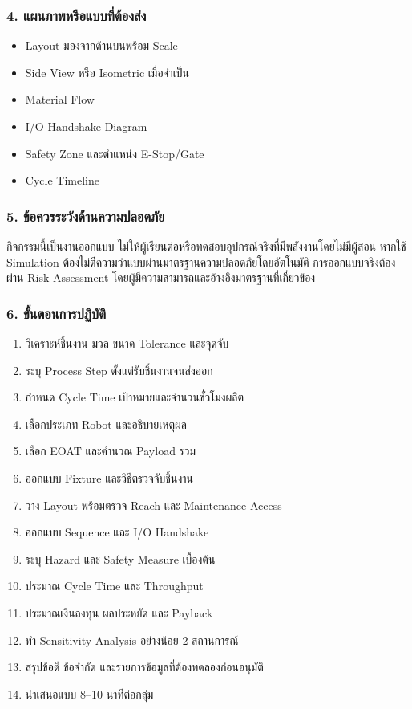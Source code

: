 \subsubsection{4. แผนภาพหรือแบบที่ต้องส่ง}

\begin{itemize}
    \item Layout มองจากด้านบนพร้อม Scale
    \item Side View หรือ Isometric เมื่อจำเป็น
    \item Material Flow
    \item I/O Handshake Diagram
    \item Safety Zone และตำแหน่ง E-Stop/Gate
    \item Cycle Timeline
\end{itemize}

\subsubsection{5. ข้อควรระวังด้านความปลอดภัย}

กิจกรรมนี้เป็นงานออกแบบ ไม่ให้ผู้เรียนต่อหรือทดสอบอุปกรณ์จริงที่มีพลังงานโดยไม่มีผู้สอน หากใช้ Simulation ต้องไม่ตีความว่าแบบผ่านมาตรฐานความปลอดภัยโดยอัตโนมัติ การออกแบบจริงต้องผ่าน Risk Assessment โดยผู้มีความสามารถและอ้างอิงมาตรฐานที่เกี่ยวข้อง

\subsubsection{6. ขั้นตอนการปฏิบัติ}

\begin{enumerate}
    \item วิเคราะห์ชิ้นงาน มวล ขนาด Tolerance และจุดจับ
    \item ระบุ Process Step ตั้งแต่รับชิ้นงานจนส่งออก
    \item กำหนด Cycle Time เป้าหมายและจำนวนชั่วโมงผลิต
    \item เลือกประเภท Robot และอธิบายเหตุผล
    \item เลือก EOAT และคำนวณ Payload รวม
    \item ออกแบบ Fixture และวิธีตรวจจับชิ้นงาน
    \item วาง Layout พร้อมตรวจ Reach และ Maintenance Access
    \item ออกแบบ Sequence และ I/O Handshake
    \item ระบุ Hazard และ Safety Measure เบื้องต้น
    \item ประมาณ Cycle Time และ Throughput
    \item ประมาณเงินลงทุน ผลประหยัด และ Payback
    \item ทำ Sensitivity Analysis อย่างน้อย 2 สถานการณ์
    \item สรุปข้อดี ข้อจำกัด และรายการข้อมูลที่ต้องทดลองก่อนอนุมัติ
    \item นำเสนอแบบ 8–10 นาทีต่อกลุ่ม
\end{enumerate}

